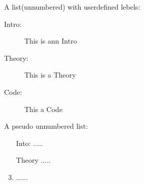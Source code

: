 \documentclass[11pt,a4paper]{article}
\begin{document}
    \vspace{\fill}


A list(unnumbered) with userdefined lebels:
    \begin{description}
        \item[Intro:] This is ann Intro
        \item[Theory:] This is a Theory
        \item[Code: ] This a Code   
    \end{description}

    \vspace{\fill}

A pseudo unnumbered list:
    \begin{enumerate}
        \item [Into:] .....
        \item [Theory] .....
        \setcounter{enumi}{2}
        \renewcommand{\labelenumi}{$\star$} 
        \item ......
    \end{enumerate}
    \vspace{\fill}
\end{document}
